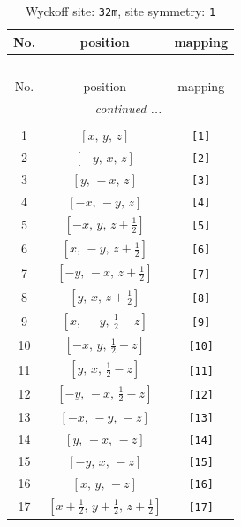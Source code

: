 \documentclass[fleqn,8pt]{jsarticle}
\begin{document}
\renewcommand{\arraystretch}{1.2}
\begin{longtable}{ccc}
\caption{Wyckoff site: {\tt 32m}, site symmetry: {\tt 1}}
 \\
 \hline \hline
No. & position & mapping \\ \hline \endfirsthead

\multicolumn{2}{l}{\tablename\ \thetable{}} \\
 \hline \hline
No. & position & mapping \\ \hline \endhead

 \hline \hline
\multicolumn{2}{r}{\footnotesize\it continued ...} \\ \endfoot

 \hline \hline
\multicolumn{2}{r}{} \\ \endlastfoot

1 & $\left[ x,\, y,\, z \right]$ & {\tt [1]} \\ \hline
2 & $\left[ - y,\, x,\, z \right]$ & {\tt [2]} \\ \hline
3 & $\left[ y,\, - x,\, z \right]$ & {\tt [3]} \\ \hline
4 & $\left[ - x,\, - y,\, z \right]$ & {\tt [4]} \\ \hline
5 & $\left[ - x,\, y,\, z + \frac{1}{2} \right]$ & {\tt [5]} \\ \hline
6 & $\left[ x,\, - y,\, z + \frac{1}{2} \right]$ & {\tt [6]} \\ \hline
7 & $\left[ - y,\, - x,\, z + \frac{1}{2} \right]$ & {\tt [7]} \\ \hline
8 & $\left[ y,\, x,\, z + \frac{1}{2} \right]$ & {\tt [8]} \\ \hline
9 & $\left[ x,\, - y,\, \frac{1}{2} - z \right]$ & {\tt [9]} \\ \hline
10 & $\left[ - x,\, y,\, \frac{1}{2} - z \right]$ & {\tt [10]} \\ \hline
11 & $\left[ y,\, x,\, \frac{1}{2} - z \right]$ & {\tt [11]} \\ \hline
12 & $\left[ - y,\, - x,\, \frac{1}{2} - z \right]$ & {\tt [12]} \\ \hline
13 & $\left[ - x,\, - y,\, - z \right]$ & {\tt [13]} \\ \hline
14 & $\left[ y,\, - x,\, - z \right]$ & {\tt [14]} \\ \hline
15 & $\left[ - y,\, x,\, - z \right]$ & {\tt [15]} \\ \hline
16 & $\left[ x,\, y,\, - z \right]$ & {\tt [16]} \\ \hline
17 & $\left[ x + \frac{1}{2},\, y + \frac{1}{2},\, z + \frac{1}{2} \right]$ & {\tt [17]} \\ \hline

\end{longtable}
\end{document}
